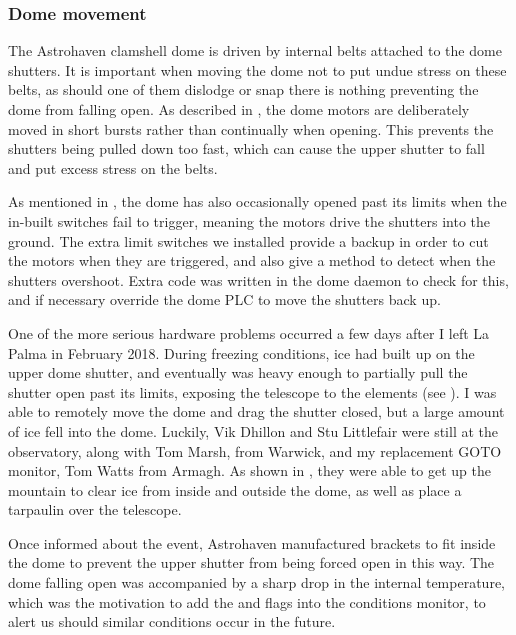 \begin{colsection}
\subsubsection{Dome movement}

The Astrohaven clamshell dome is driven by internal belts attached to the dome shutters. It is important when moving the dome not to put undue stress on these belts, as should one of them dislodge or snap there is nothing preventing the dome from falling open. As described in , the dome motors are deliberately moved in short bursts rather than continually when opening. This prevents the shutters being pulled down too fast, which can cause the upper shutter to fall and put excess stress on the belts.

As mentioned in , the dome has also occasionally opened past its limits when the in-built switches fail to trigger, meaning the motors drive the shutters into the ground. The extra limit switches we installed provide a backup in order to cut the motors when they are triggered, and also give a method to detect when the shutters overshoot. Extra code was written in the dome daemon to check for this, and if necessary override the dome PLC to move the shutters back up.

One of the more serious hardware problems occurred a few days after I left La Palma in February 2018. During freezing conditions, ice had built up on the upper dome shutter, and eventually was heavy enough to partially pull the shutter open past its limits, exposing the telescope to the elements (see ). I was able to remotely move the dome and drag the shutter closed, but a large amount of ice fell into the dome. Luckily, Vik Dhillon and Stu Littlefair were still at the observatory, along with Tom Marsh, from Warwick, and my replacement GOTO monitor, Tom Watts from Armagh. As shown in , they were able to get up the mountain to clear ice from inside and outside the dome, as well as place a tarpaulin over the telescope.

Once informed about the event, Astrohaven manufactured brackets to fit inside the dome to prevent the upper shutter from being forced open in this way. The dome falling open was accompanied by a sharp drop in the internal temperature, which was the motivation to add the  and  flags into the conditions monitor, to alert us should similar conditions occur in the future.


\end{colsection}

